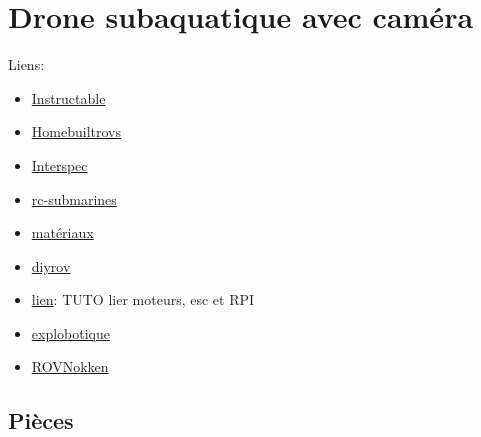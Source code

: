 \documentclass[11pt,a4paper]{article}
\begin{document}
  
  \section{Drone subaquatique avec caméra}
    Liens:
    \begin{itemize}
      \item \href{http://www.instructables.com/id/Underwater-ROV/?ALLSTEPS}{Instructable}
      \item \href{http://www.homebuiltrovs.com}{Homebuiltrovs}
      \item \href{http://www.interspec.org/}{Interspec}
      \item \href{http://www.rc-submarines.net/}{rc-submarines}
      \item \href{http://www.mcmaster.com}{matériaux}
      \item \href{http://www.diyrov.net/}{diyrov}
      \item \href{http://stephane.lavirotte.com/perso/rov/esc_brushless_raspberry.html}{lien}: TUTO lier moteurs, esc et RPI
      \item \href{http://explobotique.org/site/}{explobotique}
      \item \href{http://uzzors2k.4hv.org/?page=rovnokken}{ROVNokken}
    \end{itemize}
    
    \subsection{Pièces}
    
\end{document}
